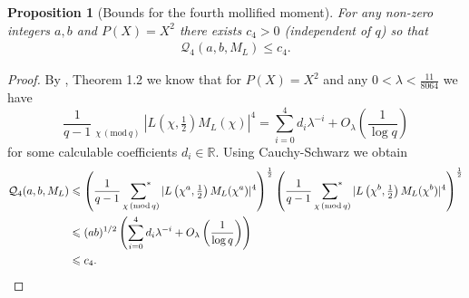 \documentclass[12pt]{amsart}
\theoremstyle{plain}
\newtheorem{prop}[thm]{Proposition}
\theoremstyle{definition}
\theoremstyle{remark}
\numberwithin{equation}{section}
\newcommand{\RR}{\mathbb{R}}
\newcommand\sumst{\mathop{{\sum}^\ast}\limits}
\newcommand{\mods}[1]{\,(\mathrm{mod}\,{#1})}
\renewcommand{\leq}{\leqslant}
\begin{document}
\begin{prop}[Bounds for the fourth mollified moment]\label{prop:fourthmollifiedmomenet}For any non-zero integers $a, b$ and $P(X)=X^2$ there exists $c_4 >0$ (independent of $q$) so that 
     \begin{align*}
              \mathcal{Q}_4(a,b,M_L) \leq  c_4.
         \end{align*}
\end{prop}
\begin{proof}
    By \cite{Zacharias2016MollificationOT}, Theorem 1.2 we know that for $P(X)=X^2$ and any $0<\lambda<\frac{11}{8064}$ we have
    \begin{equation}\label{eq: bounds from zacharias}
     \frac{1}{q-1}\sumst_{\chi\mods q}|L\left(\chi,\tfrac 12\right)M_L(\chi)|^4=\sum_{i=0}^4d_i\lambda^{-i}+O_\lambda\left(\frac{1}{\log q}\right)\end{equation}
    for some calculable coefficients $d_i\in \RR$.
    Using Cauchy-Schwarz we obtain 
    \begin{align*}
    \mathcal{Q}_4(a,b,M_L)&\leq \left(\frac{1}{q-1}\sumst_{\chi\mods q}|L\left(\chi^a,\tfrac 12\right)M_L(\chi^a)|^4\right)^{\frac12}\left(\frac{1}{q-1}\sumst_{\chi\mods q}|L\left(\chi^b,\tfrac 12\right)M_L(\chi^b)|^4\right)^{\frac12} \\
    & \leq (ab)^{1/2}\left(\sum_{i=0}^4d_i\lambda^{-i}+O_\lambda\left(\frac{1}{\log q}\right)\right)  \\
    &\leq c_4.\qedhere\end{align*} 
\end{proof}
\end{document}
